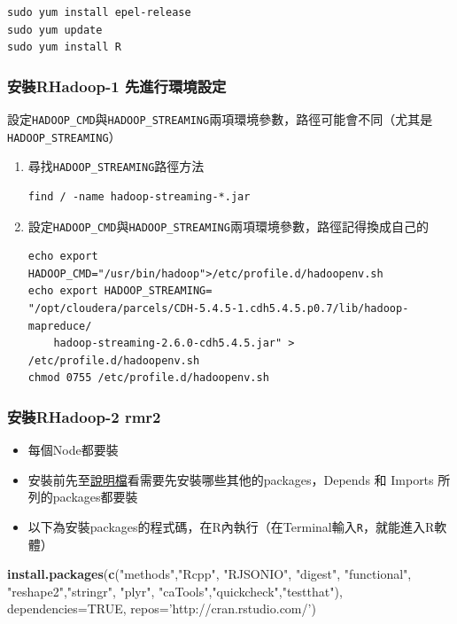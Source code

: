 \documentclass[]{book}
\newenvironment{Shaded}{\begin{snugshade}}{\end{snugshade}}
\newcommand{\KeywordTok}[1]{\textcolor[rgb]{0.13,0.29,0.53}{\textbf{{#1}}}}
\newcommand{\DataTypeTok}[1]{\textcolor[rgb]{0.13,0.29,0.53}{{#1}}}
\newcommand{\StringTok}[1]{\textcolor[rgb]{0.31,0.60,0.02}{{#1}}}
\newcommand{\OtherTok}[1]{\textcolor[rgb]{0.56,0.35,0.01}{{#1}}}
\newcommand{\NormalTok}[1]{{#1}}
\providecommand{\tightlist}{%
  \setlength{\itemsep}{0pt}\setlength{\parskip}{0pt}}
\theoremstyle{definition}
\theoremstyle{definition}
\theoremstyle{remark}
\begin{document}
\begin{verbatim}
sudo yum install epel-release
sudo yum update
sudo yum install R
\end{verbatim}

\subsubsection{安裝RHadoop-1 先進行環境設定}\label{rhadoop-1-}

設定\texttt{HADOOP\_CMD}與\texttt{HADOOP\_STREAMING}兩項環境參數，路徑可能會不同（尤其是\texttt{HADOOP\_STREAMING}）

\begin{enumerate}
\def\labelenumi{\arabic{enumi}.}
\item
  尋找\texttt{HADOOP\_STREAMING}路徑方法

\begin{verbatim}
find / -name hadoop-streaming-*.jar
\end{verbatim}
\item
  設定\texttt{HADOOP\_CMD}與\texttt{HADOOP\_STREAMING}兩項環境參數，路徑記得換成自己的

\begin{verbatim}
echo export HADOOP_CMD="/usr/bin/hadoop">/etc/profile.d/hadoopenv.sh
echo export HADOOP_STREAMING=
"/opt/cloudera/parcels/CDH-5.4.5-1.cdh5.4.5.p0.7/lib/hadoop-mapreduce/
    hadoop-streaming-2.6.0-cdh5.4.5.jar" > /etc/profile.d/hadoopenv.sh
chmod 0755 /etc/profile.d/hadoopenv.sh
\end{verbatim}
\end{enumerate}

\subsubsection{安裝RHadoop-2 rmr2}\label{rhadoop-2-rmr2}

\begin{itemize}
\tightlist
\item
  每個Node都要裝
\item
  安裝前先至\href{https://github.com/RevolutionAnalytics/rmr2/blob/master/pkg/DESCRIPTION}{說明檔}看需要先安裝哪些其他的packages，Depends
  和 Imports 所列的packages都要裝
\item
  以下為安裝packages的程式碼，在R內執行（在Terminal輸入\texttt{R}，就能進入R軟體）
\end{itemize}

\begin{Shaded}
\begin{Highlighting}[]
\KeywordTok{install.packages}\NormalTok{(}\KeywordTok{c}\NormalTok{(}\StringTok{"methods"}\NormalTok{,}\StringTok{"Rcpp"}\NormalTok{, }\StringTok{"RJSONIO"}\NormalTok{, }\StringTok{"digest"}\NormalTok{, }\StringTok{"functional"}\NormalTok{, }
                   \StringTok{"reshape2"}\NormalTok{,}\StringTok{"stringr"}\NormalTok{, }\StringTok{"plyr"}\NormalTok{, }\StringTok{"caTools"}\NormalTok{,}\StringTok{"quickcheck"}\NormalTok{,}\StringTok{"testthat"}\NormalTok{), }
                 \DataTypeTok{dependencies=}\OtherTok{TRUE}\NormalTok{, }\DataTypeTok{repos=}\StringTok{'http://cran.rstudio.com/'}\NormalTok{)}
\end{Highlighting}
\end{Shaded}
\end{document}
